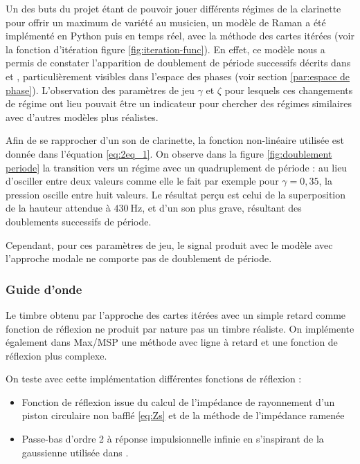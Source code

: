 Un des buts du projet étant de pouvoir jouer différents régimes de la clarinette pour offrir un maximum de variété au musicien, un modèle de Raman a été implémenté en Python puis en temps réel, avec la méthode des cartes itérées (voir la fonction d'itération figure \ref{fig:iteration-func}). En effet, ce modèle nous a permis de constater l'apparition de doublement de période successifs décrits dans \cite{maganza_bifurcations_1986} et \cite{taillardIteratedMapsClarinetlike2010}, particulièrement visibles dans l'espace des phases (voir section \ref{par:espace de phase}). L'observation des paramètres de jeu $\gamma$ et $\zeta$ pour lesquels ces changements de régime ont lieu pouvait être un indicateur pour chercher des régimes similaires avec d'autres modèles plus réalistes.

Afin de se rapprocher d'un son de clarinette, la fonction non-linéaire utilisée est donnée dans l'équation \eqref{eq:2eq_1}. On observe dans la figure \ref{fig:doublement periode} la transition vers un régime avec un quadruplement de période : au lieu d'osciller entre deux valeurs comme elle le fait par exemple pour $\gamma=0,35$, la pression oscille entre huit valeurs. Le résultat perçu est celui de la superposition de la hauteur attendue à $\SI{430}{\Hz}$, et d'un son plus grave, résultant des doublements successifs de période.

Cependant, pour ces paramètres de jeu, le signal produit avec le modèle avec l'approche modale ne comporte pas de doublement de période.



\subsubsection{Guide d'onde}

Le timbre obtenu par l'approche des cartes itérées avec un simple retard comme fonction de réflexion ne produit par nature pas un timbre réaliste. On implémente également dans Max/MSP une méthode avec ligne à retard et une fonction de réflexion plus complexe.

On teste avec cette implémentation différentes fonctions de réflexion :
\begin{itemize}
    \item Fonction de réflexion issue du calcul de l'impédance de rayonnement d'un piston circulaire non bafflé \eqref{eq:Zs} et de la méthode de l'impédance ramenée
    \item Passe-bas d'ordre 2 à réponse impulsionnelle infinie en s'inspirant de la gaussienne utilisée dans \cite{mcintyre_oscillations_1983}.
\end{itemize}

